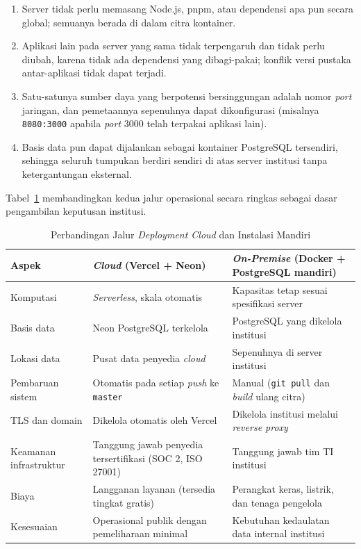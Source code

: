 \begin{enumerate}[leftmargin=2cm]
  \item Server tidak perlu memasang Node.js, pnpm, atau dependensi apa pun secara global; semuanya berada di dalam citra kontainer.
  \item Aplikasi lain pada server yang sama tidak terpengaruh dan tidak perlu diubah, karena tidak ada dependensi yang dibagi-pakai; konflik versi pustaka antar-aplikasi tidak dapat terjadi.
  \item Satu-satunya sumber daya yang berpotensi bersinggungan adalah nomor \textit{port} jaringan, dan pemetaannya sepenuhnya dapat dikonfigurasi (misalnya \texttt{8080:3000} apabila \textit{port} 3000 telah terpakai aplikasi lain).
  \item Basis data pun dapat dijalankan sebagai kontainer PostgreSQL tersendiri, sehingga seluruh tumpukan berdiri sendiri di atas server institusi tanpa ketergantungan eksternal.
\end{enumerate}

Tabel~\ref{tab:cloud-vs-onprem} membandingkan kedua jalur operasional secara ringkas sebagai dasar pengambilan keputusan institusi.

\begin{table}[htbp]
  \centering
  \caption{Perbandingan Jalur \textit{Deployment Cloud} dan Instalasi Mandiri}
  \label{tab:cloud-vs-onprem}
  \begin{tabularx}{\textwidth}{@{}p{3.2cm} X X@{}}
    \toprule
    \textbf{Aspek} & \textbf{\textit{Cloud} (Vercel + Neon)} & \textbf{\textit{On-Premise} (Docker + PostgreSQL mandiri)} \\
    \midrule
    Komputasi & \textit{Serverless}, skala otomatis & Kapasitas tetap sesuai spesifikasi server \\
    Basis data & Neon PostgreSQL terkelola & PostgreSQL yang dikelola institusi \\
    Lokasi data & Pusat data penyedia \textit{cloud} & Sepenuhnya di server institusi \\
    Pembaruan sistem & Otomatis pada setiap \textit{push} ke \texttt{master} & Manual (\texttt{git pull} dan \textit{build} ulang citra) \\
    TLS dan domain & Dikelola otomatis oleh Vercel & Dikelola institusi melalui \textit{reverse proxy} \\
    Keamanan infrastruktur & Tanggung jawab penyedia tersertifikasi (SOC 2, ISO 27001) & Tanggung jawab tim TI institusi \\
    Biaya & Langganan layanan (tersedia tingkat gratis) & Perangkat keras, listrik, dan tenaga pengelola \\
    Kesesuaian & Operasional publik dengan pemeliharaan minimal & Kebutuhan kedaulatan data internal institusi \\
    \bottomrule
  \end{tabularx}
\end{table}

